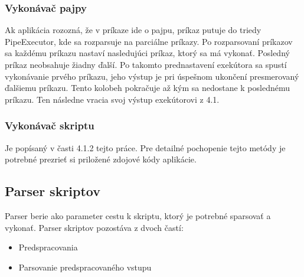{\subsubsection{Vykonávač pajpy}
\indent Ak aplikácia rozozná, že v príkaze ide o pajpu, príkaz putuje do triedy PipeExecutor, kde sa rozparsuje na parciálne príkazy. Po rozparsovaní príkazov sa každému príkazu nastaví nasledujúci príkaz, ktorý sa má vykonať. Posledný príkaz neobsahuje žiadny ďalší. Po takomto prednastavení exekútora sa spustí vykonávanie prvého príkazu, jeho výstup je pri úspešnom ukončení presmerovaný ďalšiemu príkazu. Tento kolobeh pokračuje až kým sa nedostane k poslednému príkazu. Ten následne vracia svoj výstup exekútorovi z 4.1.
\subsubsection{Vykonávač skriptu}
\indent Je popísaný v časti 4.1.2 tejto práce. Pre detailné pochopenie tejto metódy je potrebné prezrieť si priložené zdojové kódy aplikácie.
\subsection{Parser skriptov}
\indent Parser berie ako parameter cestu k skriptu, ktorý je potrebné sparsovať a vykonať. Parser skriptov pozostáva z dvoch častí: 
\begin{itemize}
	\item Predspracovania
	\item Parsovanie predspracovaného vstupu
\end{itemize}
}
